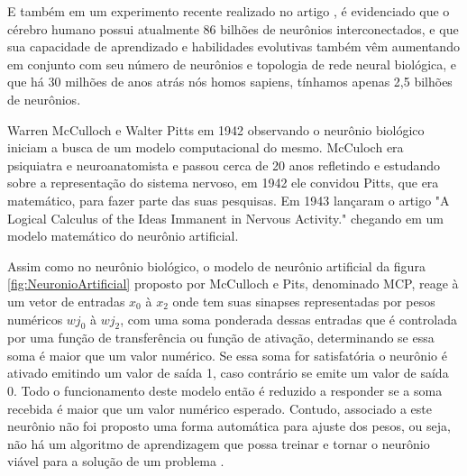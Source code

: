 E também em um experimento recente realizado no artigo \cite{Fapesp192}, é evidenciado que o cérebro humano possui atualmente 86 bilhões de neurônios interconectados, e que sua capacidade de aprendizado e habilidades evolutivas também vêm aumentando em conjunto com seu número de neurônios e topologia de rede neural biológica, e que há 30 milhões de anos atrás nós homos sapiens, tínhamos apenas 2,5 bilhões de neurônios.

Warren McCulloch e Walter Pitts em 1942 observando o neurônio biológico iniciam a busca de um modelo computacional do mesmo. McCuloch era psiquiatra e neuroanatomista e passou cerca de 20 anos refletindo e estudando sobre a representação do sistema nervoso, em 1942 ele convidou Pitts, que era matemático, para fazer parte das suas pesquisas. Em 1943 lançaram o artigo "A Logical Calculus of the Ideas Immanent in Nervous Activity." chegando em um modelo matemático do neurônio artificial. 

            \begin{figure}[H]
            \end{figure}

Assim como no neurônio biológico, o modelo de neurônio artificial da figura \ref{fig:NeuronioArtificial} proposto por McCulloch e Pits, denominado MCP, reage à um vetor de entradas $x_0$ à $x_2$ onde tem suas sinapses representadas por pesos numéricos $wj_0$ à $wj_2$, com uma soma ponderada dessas entradas que é controlada por uma função de transferência ou função de ativação, determinando se essa soma é maior que um valor numérico. Se essa soma for satisfatória o neurônio é ativado emitindo um valor de saída 1, caso contrário se emite um valor de saída 0.
Todo o funcionamento deste modelo então é reduzido a responder se a soma recebida é maior que um valor numérico esperado. Contudo, associado a este neurônio não foi proposto uma forma automática para ajuste dos pesos, ou seja, não há um algoritmo de aprendizagem que possa treinar e tornar o neurônio viável para a solução de um problema \cite{Haykin1994}.
        
